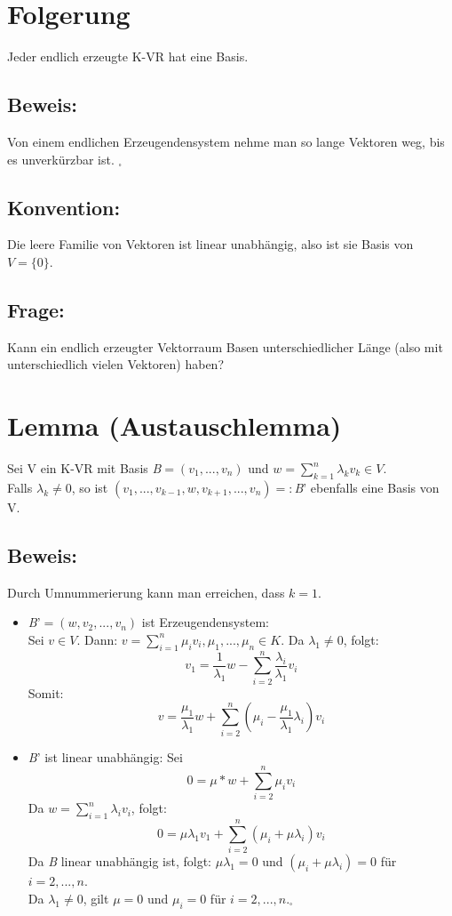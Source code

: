 \documentclass{scrbook}
\begin{document}
\section{Folgerung}
Jeder endlich erzeugte K-VR hat eine Basis.
\subsection*{Beweis:}
Von einem endlichen Erzeugendensystem nehme man so lange Vektoren weg, bis es unverkürzbar ist. $_\square$
\subsection*{Konvention:}
Die leere Familie von Vektoren ist linear unabhängig, also ist sie Basis von $V=\{0\}$.
\subsection*{Frage:}
Kann ein endlich erzeugter Vektorraum Basen unterschiedlicher Länge (also mit unterschiedlich vielen Vektoren) haben?
\section{Lemma (Austauschlemma)}
Sei V ein K-VR mit Basis \textit{B}$=(v_1,...,v_n)$ und $w=\sum^n_{k=1}\lambda_kv_k \in V$.\\
Falls $\lambda_k \neq 0$, so ist $(v_1,...,v_{k-1},w,v_{k+1},...,v_n) =:$\textit{B}' ebenfalls eine Basis von V.
\subsection*{Beweis:}
Durch Umnummerierung kann man erreichen, dass $k=1$. \begin{itemize}
\item \textit{B}'$=(w,v_2,...,v_n)$ ist Erzeugendensystem:\\
Sei $v\in V$. Dann: $v= \sum^n_{i=1}\mu_iv_i,\mu_1,...,\mu_n \in K$. Da $\lambda_1\neq 0$, folgt:
\[
v_1=\dfrac{1}{\lambda_1}w-\sum^n_{i=2}\dfrac{\lambda_i}{\lambda_1}v_i
\]
Somit:
\[
v=\dfrac{\mu_1}{\lambda_1}w+\sum^n_{i=2} (\mu_i-\dfrac{\mu_1}{\lambda_1}\lambda_i)v_i
\]
\item \textit{B}' ist linear unabhängig: Sei
\[
0=\mu * w + \sum^n_{i=2}\mu_i v_i
\]
Da $w=\sum^n_{i=1}\lambda_iv_i$, folgt:
\[
0=\mu \lambda_1 v_1 +\sum^n_{i=2}(\mu_i+\mu\lambda_i)v_i
\]
Da \textit{B} linear unabhängig ist, folgt: $\mu\lambda_1 = 0$ und $(\mu_i+\mu\lambda_i)=0$ für $i=2,...,n$.\\
Da $\lambda_1\neq 0$, gilt $\mu = 0$ und $\mu_i=0$ für $i=2,...,n$.$_\square$
\end{itemize}
\end{document}
